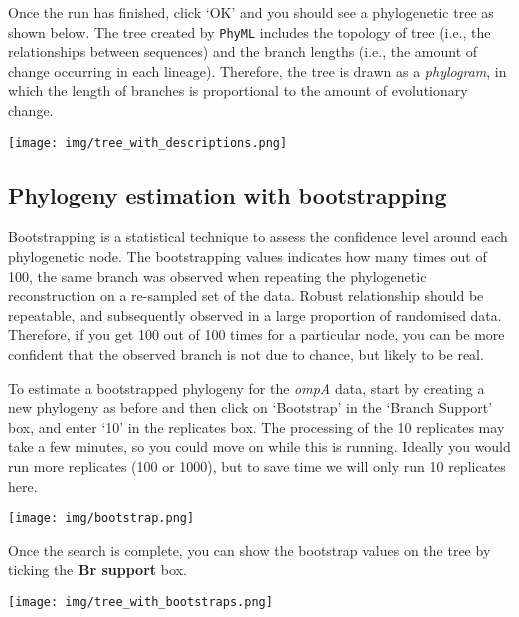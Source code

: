 \documentclass[11pt]{article}
\begin{document}
    Once the run has finished, click `OK' and you should see a phylogenetic
tree as shown below. The tree created by \texttt{PhyML} includes the
topology of tree (i.e., the relationships between sequences) and the
branch lengths (i.e., the amount of change occurring in each lineage).
Therefore, the tree is drawn as a \textit{phylogram}, in which the length
of branches is proportional to the amount of evolutionary change.


\begin{center}
\texttt{[image: img/tree\_with\_descriptions.png]}
\end{center}


    \hypertarget{phylogeny-estimation-with-bootstrapping}{%
\subsection{Phylogeny estimation with
bootstrapping}\label{phylogeny-estimation-with-bootstrapping}}

Bootstrapping is a statistical technique to assess the confidence level
around each phylogenetic node. The bootstrapping values indicates how
many times out of 100, the same branch was observed when repeating the
phylogenetic reconstruction on a re-sampled set of the data. Robust
relationship should be repeatable, and subsequently observed in a large
proportion of randomised data. Therefore, if you get 100 out of 100
times for a particular node, you can be more confident that the observed
branch is not due to chance, but likely to be real.

To estimate a bootstrapped phylogeny for the \textit{ompA} data, start by
creating a new phylogeny as before and then click on `Bootstrap' in the
`Branch Support' box, and enter `10' in the replicates box. The
processing of the 10 replicates may take a few minutes, so you could
move on while this is running. Ideally you would run more replicates
(100 or 1000), but to save time we will only run 10 replicates here.


\begin{center}
\texttt{[image: img/bootstrap.png]}
\end{center}


Once the search is complete, you can show the bootstrap values on the
tree by ticking the \textbf{Br support} box.


\begin{center}
\texttt{[image: img/tree\_with\_bootstraps.png]}
\end{center}
\end{document}
